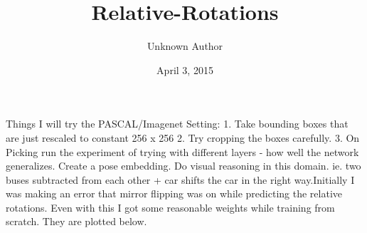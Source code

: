 \documentclass[letterpaper,10pt,english]{/usr/share/sphinx/texinputs/sphinxhowto}
\title{Relative-Rotations}
\date{April 3, 2015}
\author{Unknown Author}
\begin{document}
        
            \maketitle
        

        


        
        Things I will try the PASCAL/Imagenet Setting: 1. Take bounding boxes
that are just rescaled to constant 256 x 256 2. Try cropping the boxes
carefully. 3. On Picking run the experiment of trying with different
layers - how well the network generalizes. Create a pose embedding. Do
visual reasoning in this domain. ie. two buses subtracted from each
other + car shifts the car in the right way.Initially I was making an error that mirror flipping was on while
predicting the relative rotations. Even with this I got some reasonable
weights while training from scratch. They are plotted below.

\end{document}
